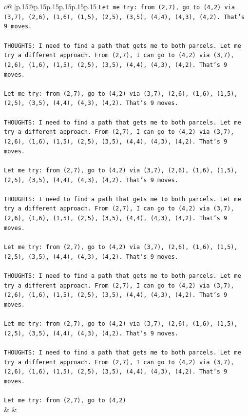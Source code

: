 \documentclass{article}
\begin{document}
{\begin{supertabular}{c@{$\;$}|p{.15\linewidth}@{}p{.15\linewidth}p{.15\linewidth}p{.15\linewidth}p{.15\linewidth}p{.15\linewidth}}
{{{\texttt{Let me try: from (2,7), go to (4,2) via (3,7), (2,6), (1,6), (1,5), (2,5), (3,5), (4,4), (4,3), (4,2). That's 9 moves.} \\
\\ 
\texttt{THOUGHTS: I need to find a path that gets me to both parcels. Let me try a different approach. From (2,7), I can go to (4,2) via (3,7), (2,6), (1,6), (1,5), (2,5), (3,5), (4,4), (4,3), (4,2). That's 9 moves.} \\
\\ 
\texttt{Let me try: from (2,7), go to (4,2) via (3,7), (2,6), (1,6), (1,5), (2,5), (3,5), (4,4), (4,3), (4,2). That's 9 moves.} \\
\\ 
\texttt{THOUGHTS: I need to find a path that gets me to both parcels. Let me try a different approach. From (2,7), I can go to (4,2) via (3,7), (2,6), (1,6), (1,5), (2,5), (3,5), (4,4), (4,3), (4,2). That's 9 moves.} \\
\\ 
\texttt{Let me try: from (2,7), go to (4,2) via (3,7), (2,6), (1,6), (1,5), (2,5), (3,5), (4,4), (4,3), (4,2). That's 9 moves.} \\
\\ 
\texttt{THOUGHTS: I need to find a path that gets me to both parcels. Let me try a different approach. From (2,7), I can go to (4,2) via (3,7), (2,6), (1,6), (1,5), (2,5), (3,5), (4,4), (4,3), (4,2). That's 9 moves.} \\
\\ 
\texttt{Let me try: from (2,7), go to (4,2) via (3,7), (2,6), (1,6), (1,5), (2,5), (3,5), (4,4), (4,3), (4,2). That's 9 moves.} \\
\\ 
\texttt{THOUGHTS: I need to find a path that gets me to both parcels. Let me try a different approach. From (2,7), I can go to (4,2) via (3,7), (2,6), (1,6), (1,5), (2,5), (3,5), (4,4), (4,3), (4,2). That's 9 moves.} \\
\\ 
\texttt{Let me try: from (2,7), go to (4,2) via (3,7), (2,6), (1,6), (1,5), (2,5), (3,5), (4,4), (4,3), (4,2). That's 9 moves.} \\
\\ 
\texttt{THOUGHTS: I need to find a path that gets me to both parcels. Let me try a different approach. From (2,7), I can go to (4,2) via (3,7), (2,6), (1,6), (1,5), (2,5), (3,5), (4,4), (4,3), (4,2). That's 9 moves.} \\
\\ 
\texttt{Let me try: from (2,7), go to (4,2)} \\
            }
        }
    }
    & & \\ \\


\end{supertabular}}
\end{document}
